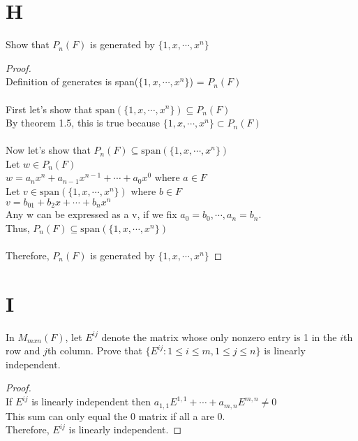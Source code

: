 \documentclass[11pt]{scrartcl}
\begin{document}
\section{H} 
Show that $P_n(F)$ is generated by $\{1, x, \cdots, x^n\}$
\begin{proof}
	\-\\
	Definition of generates is span($\{1, x, \cdots, x^n\}$) = $P_n(F)$\\
	\-\\
	First let's show that $\text{span}(\{1, x, \cdots, x^n\}) \subseteq P_n(F)$\\
	By theorem 1.5, this is true because $\{1, x, \cdots, x^n\} \subset P_n(F)$\\
	\-\\
	Now let's show that $P_n(F) \subseteq \text{span}(\{1, x, \cdots, x^n\})$\\
	Let $w \in P_n(F)$\\
	$w = a_nx^n + a_{n-1}x^{n-1} + \cdots + a_0x^0$ where $a\in F$\\
	Let $ v\in \text{span}(\{1, x, \cdots, x^n\})$ where $b \in F$\\
	$v = b_01 + b_2x + \cdots + b_n x^n$ \\
	Any w can be expressed as a v, if we fix $a_0 = b_0, \cdots, a_n = b_n$.\\	
	Thus, $P_n(F) \subseteq \text{span}(\{1, x, \cdots, x^n\})$\\
	\-\\
	Therefore, $P_n(F)$ is generated by $\{1, x, \cdots, x^n\}$
\end{proof}
\section{I} 
In $M_{mxn}(F)$, let $E^{ij}$ denote the matrix whose only nonzero entry is 1 in the $i$th row and $j$th column. Prove that $\{E^{ij}: 1 \leq i \leq m,
1 \leq j \leq n\}$ is linearly independent.
\begin{proof}
	\-\\
	If $E^{ij}$ is linearly independent then $a_{1,1}E^{1,1} + \cdots + a_{m,n}E^{m,n} \neq 0$\\
	This sum can only equal the 0 matrix if all a are 0.\\
	Therefore, $E^{ij}$ is linearly independent.
\end{proof}
\end{document}
